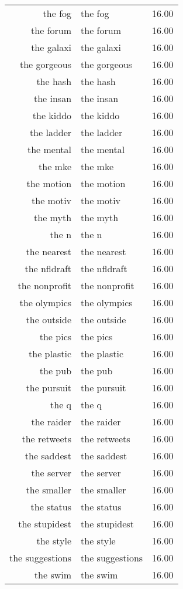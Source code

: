 \begin{table}[ht]
\begin{tabular}{rlr}
  the fog & the fog & 16.00 \\ 
  the forum & the forum & 16.00 \\ 
  the galaxi & the galaxi & 16.00 \\ 
  the gorgeous & the gorgeous & 16.00 \\ 
  the hash & the hash & 16.00 \\ 
  the insan & the insan & 16.00 \\ 
  the kiddo & the kiddo & 16.00 \\ 
  the ladder & the ladder & 16.00 \\ 
  the mental & the mental & 16.00 \\ 
  the mke & the mke & 16.00 \\ 
  the motion & the motion & 16.00 \\ 
  the motiv & the motiv & 16.00 \\ 
  the myth & the myth & 16.00 \\ 
  the n & the n & 16.00 \\ 
  the nearest & the nearest & 16.00 \\ 
  the nfldraft & the nfldraft & 16.00 \\ 
  the nonprofit & the nonprofit & 16.00 \\ 
  the olympics & the olympics & 16.00 \\ 
  the outside & the outside & 16.00 \\ 
  the pics & the pics & 16.00 \\ 
  the plastic & the plastic & 16.00 \\ 
  the pub & the pub & 16.00 \\ 
  the pursuit & the pursuit & 16.00 \\ 
  the q & the q & 16.00 \\ 
  the raider & the raider & 16.00 \\ 
  the retweets & the retweets & 16.00 \\ 
  the saddest & the saddest & 16.00 \\ 
  the server & the server & 16.00 \\ 
  the smaller & the smaller & 16.00 \\ 
  the status & the status & 16.00 \\ 
  the stupidest & the stupidest & 16.00 \\ 
  the style & the style & 16.00 \\ 
  the suggestions & the suggestions & 16.00 \\ 
  the swim & the swim & 16.00 \\ 

\end{tabular}
\end{table}
